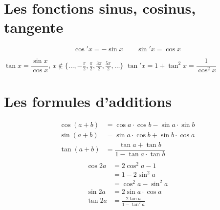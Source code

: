 \section{Les fonctions sinus, cosinus, tangente}

\begin{frame}


\pause


\pause
\vspace*{-3ex}
$$\cos'x= -\sin x \qquad \sin'x=\cos x$$
\end{frame}


\begin{frame}
\vspace*{2ex}
\hspace*{-2em}$\tan x = \dfrac{\sin x}{\cos x}$, 
{\footnotesize $x \notin\{\ldots, -\frac\pi2, \frac\pi2, \frac{3\pi}{2}, \frac{5\pi}{2},\ldots  \}$}
\quad  $\tan' x = 1+\tan^2x=\dfrac{1}{\cos^2x}$



\end{frame}









\section{Les formules d'additions}


\begin{frame}
\begin{align*}
\cos(a+b) &= \cos a \cdot \cos b - \sin a \cdot \sin b \\
\sin(a+b) &= \sin a\cdot \cos b  +  \sin b\cdot\cos a \\
\tan (a+b) &=\dfrac{\tan a + \tan b}{1-\tan a \cdot \tan b}\\
\end{align*}
\pause\vspace*{-3ex}
\begin{align*}
\cos 2a &= 2\cos^2a-1\\
    &= 1-2\sin^2a\\
    &=\cos^2a-\sin^2a\\[3mm]
\sin 2a &= 2\sin a\cdot \cos a\\[3mm]
\tan 2a &= \frac{2\tan a}{1-\tan^2 a}
\end{align*}  
\end{frame}



